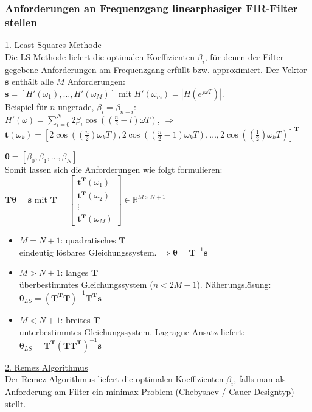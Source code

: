 \documentclass[a4paper,landscape,6pt]{article}
\newcommand{\ma}[1]{\ensuremath{\boldsymbol {#1}}}								%
\newcommand{\mat}[1]{\ensuremath{\begin{bmatrix} #1 \end{bmatrix}}}				%
\renewcommand{\vec}[1]{\ensuremath{\boldsymbol {#1}}}							%
\begin{document}
\begin{multicols}{3}
\subsubsection*{Anforderungen an Frequenzgang linearphasiger FIR-Filter stellen}
\underline{1. Least Squares Methode}\\
Die LS-Methode liefert die optimalen Koeffizienten $\beta_i$, für denen der Filter gegebene Anforderungen am Frequenzgang erfüllt bzw. approximiert.
Der Vektor $\vec s$ enthält alle $M$ Anforderungen:\\
$\vec s = [H'(\omega_1), \dots , H'(\omega_M)]$
mit $H'(\omega_m) = |H(e^{j\omega T})|$.\\
Beispiel für $n$ ungerade, $\beta_i = \beta_{n-i}$:\\
$H'(\omega) = \sum\limits_{i=0}^{N} 2\beta_i \cos((\frac{n}{2}-i)\omega T)$, $\Rightarrow$\\

$\vec t(\omega_k) = [2\cos((\frac{n}{2})\omega_k T), 2\cos((\frac{n}{2} - 1)\omega_k T) , \dots , 2\cos((\frac{1}{2})\omega_k T)]^{\ma T}$

$\vec \theta = [\beta_0, \beta_1, \dots , \beta_N]$\\

Somit lassen sich die Anforderungen wie folgt formulieren:\\
\tab $\ma T \vec \theta = \vec s$ \tab mit $\ma T = \mat{\vec t^{\ma T}(\omega_1) \\ \vec t^{\ma T}(\omega_2) \\ \vdots \\ \vec t^{\ma T}(\omega_M)} \in \mathbb{R}^{M \times N+1}$

\begin{itemize}
	\item $M = N+1$: quadratisches $\ma T$\\
	eindeutig lösbares Gleichungssystem. $ \Rightarrow \vec \theta = \ma T^{-1} \vec s$
	\item $M > N+1$: langes $\ma T$\\
	überbestimmtes Gleichungssystem ($n < 2M-1 $). Näherungslösung: 
	$\vec \theta_{LS} = (\ma T^{\ma T} \ma T)^{-1} \ma T ^{ \ma T} \vec s$
	\item $M < N+1$: breites $\ma T$\\
	unterbestimmtes Gleichungssystem. Lagragne-Ansatz liefert: 
	$\vec \theta_{LS} = \ma T ^{ \ma T}(\ma T \ma T ^{ \ma T})^{-1} \vec s$ 
\end{itemize}

\underline{2. Remez Algorithmus}\\
Der Remez Algorithmus liefert die optimalen Koeffizienten $\beta_i$, falls man als Anforderung am Filter ein minimax-Problem (Chebyshev / Cauer Designtyp) stellt.\\


\end{multicols}
\end{document}
